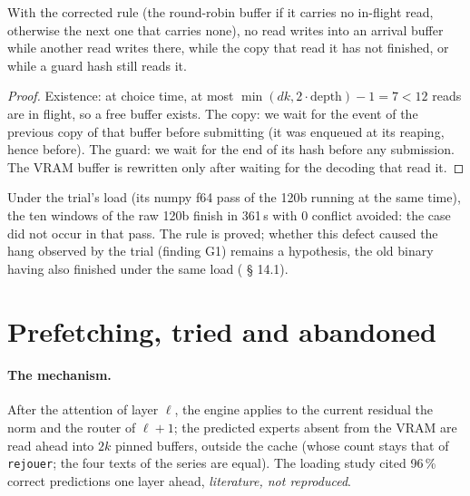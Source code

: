 \begin{lemme}\label{lem:t2o-tampons}
With the corrected rule (the round-robin buffer if it carries no in-flight read, otherwise the next one that carries none), no read writes into an arrival buffer while another read writes there, while the copy that read it has not finished, or while a guard hash still reads it.
\end{lemme}

\begin{proof}
Existence: at choice time, at most $\min(dk, 2\cdot\text{depth}) - 1 = 7 < 12$ reads are in flight, so a free buffer exists. The copy: we wait for the event of the previous copy of that buffer before submitting (it was enqueued at its reaping, hence before). The guard: we wait for the end of its hash before any submission. The VRAM buffer is rewritten only after waiting for the decoding that read it.
\end{proof}

Under the trial's load (its numpy f64 pass of the 120b running at the same time), the ten windows of the raw 120b finish in 361\,s with 0 conflict avoided: the case did not occur in that pass. The rule is proved; whether this defect caused the hang observed by the trial (finding G1) remains a hypothesis, the old binary having also finished under the same load ( § 14.1).

\section{Prefetching, tried and abandoned}\label{sec:t2o-prechargement}

\paragraph{The mechanism.} After the attention of layer $\ell$, the engine applies to the current residual the norm and the router of $\ell + 1$; the predicted experts absent from the VRAM are read ahead into $2k$ pinned buffers, outside the cache (whose count stays that of \texttt{rejouer}; the four texts of the series are equal). The loading study cited 96\,\% correct predictions one layer ahead, \emph{literature, not reproduced}.

